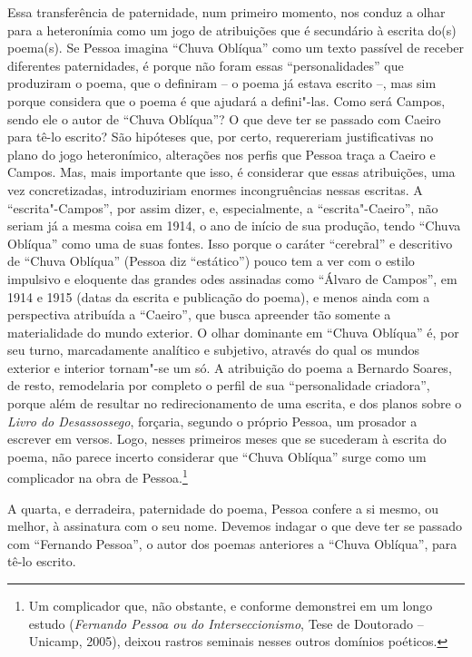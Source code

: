 Essa transferência de paternidade, num primeiro momento, nos conduz a
olhar para a heteronímia como um jogo de atribuições que é secundário à
escrita do(s) poema(s). Se Pessoa imagina ``Chuva Oblíqua'' como um
texto passível de receber diferentes paternidades, é porque não foram
essas ``personalidades'' que produziram o poema, que o definiram -- o
poema já estava escrito --, mas sim porque considera que o poema é que
ajudará a defini"-las. Como será Campos, sendo ele o autor de ``Chuva
Oblíqua''? O que deve ter se passado com Caeiro para tê-lo escrito? São
hipóteses que, por certo, requereriam justificativas no plano do jogo
heteronímico, alterações nos perfis que Pessoa traça a Caeiro e Campos.
Mas, mais importante que isso, é considerar que essas atribuições, uma
vez concretizadas, introduziriam enormes incongruências nessas escritas.
A ``escrita"-Campos'', por assim dizer, e, especialmente, a
``escrita"-Caeiro'', não seriam já a mesma coisa em 1914, o ano de início
de sua produção, tendo ``Chuva Oblíqua'' como uma de suas fontes. Isso
porque o caráter ``cerebral'' e descritivo de ``Chuva Oblíqua'' (Pessoa
diz ``estático'') pouco tem a ver com o estilo impulsivo e eloquente das
grandes odes assinadas como ``Álvaro de Campos'', em 1914 e 1915 (datas
da escrita e publicação do poema), e menos ainda com a perspectiva
atribuída a ``Caeiro'', que busca apreender tão somente a materialidade
do mundo exterior. O olhar dominante em ``Chuva Oblíqua'' é, por seu
turno, marcadamente analítico e subjetivo, através do qual os mundos
exterior e interior tornam"-se um só. A atribuição do poema a Bernardo
Soares, de resto, remodelaria por completo o perfil de sua
``personalidade criadora'', porque além de resultar no redirecionamento
de uma escrita, e dos planos sobre o \emph{Livro do Desassossego},
forçaria, segundo o próprio Pessoa, um prosador a escrever em versos.
Logo, nesses primeiros meses que se sucederam à escrita do poema, não
parece incerto considerar que ``Chuva Oblíqua'' surge como um
complicador na obra de Pessoa.\footnote{Um complicador que, não
  obstante, e conforme demonstrei em um longo estudo (\emph{Fernando
  Pessoa ou do Interseccionismo}, Tese de Doutorado -- Unicamp, 2005),
  deixou rastros seminais nesses outros domínios poéticos.}

A quarta, e derradeira, paternidade do poema, Pessoa confere a si mesmo,
ou melhor, à assinatura com o seu nome. Devemos indagar o que deve ter
se passado com ``Fernando Pessoa'', o autor dos poemas anteriores a
``Chuva Oblíqua'', para tê-lo escrito.

